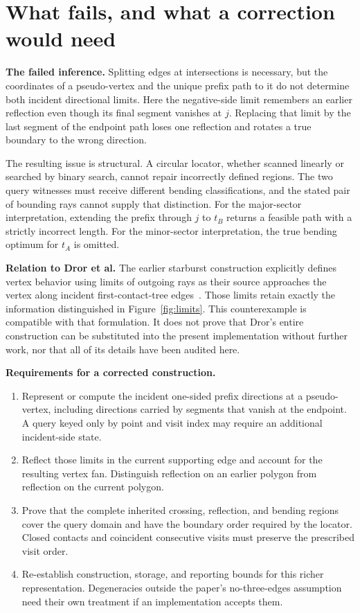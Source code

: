 \documentclass[11pt,a4paper]{article}
\newcommand{\sect}[2]{\section{#1}\label{#2}}
\begin{document}
\clearpage
\sect{What fails, and what a correction would need}{sec:scope}

\textbf{The failed inference.} Splitting edges at intersections is necessary,
but the coordinates of a pseudo-vertex and the unique prefix path to it do not
determine both incident directional limits. Here the negative-side limit
remembers an earlier reflection even though its final segment vanishes at $j$.
Replacing that limit by the last segment of the endpoint path loses one
reflection and rotates a true boundary to the wrong direction.

The resulting issue is structural. A circular locator, whether scanned
linearly or searched by binary search, cannot repair incorrectly defined
regions. The two query witnesses must receive different bending classifications,
and the stated pair of bounding rays cannot supply that distinction. For the
major-sector interpretation, extending the prefix through $j$ to $t_B$ returns
a feasible path with a strictly incorrect length. For the minor-sector
interpretation, the true bending optimum for $t_A$ is omitted.

\textbf{Relation to Dror et al.} The earlier starburst construction explicitly
defines vertex behavior using limits of outgoing rays as their source
approaches the vertex along incident first-contact-tree edges~\cite[Section
4.1, Claim 1 immediately before Lemma 7, p.~477]{dror}. Those limits retain
exactly the information distinguished in Figure~\ref{fig:limits}. This
counterexample is compatible with that formulation. It does not prove that
Dror's entire construction can be substituted into the present implementation
without further work, nor that all of its details have been audited here.

\textbf{Requirements for a corrected construction.}
\begin{enumerate}
 \item Represent or compute the incident one-sided prefix directions at a
 pseudo-vertex, including directions carried by segments that vanish at the
 endpoint. A query keyed only by point and visit index may require an
 additional incident-side state.
 \item Reflect those limits in the current supporting edge and account for
 the resulting vertex fan. Distinguish reflection on an earlier polygon from
 reflection on the current polygon.
 \item Prove that the complete inherited crossing, reflection, and bending
 regions cover the query domain and have the boundary order required by the
 locator. Closed contacts and coincident consecutive visits must preserve the
 prescribed visit order.
 \item Re-establish construction, storage, and reporting bounds for this
 richer representation. Degeneracies outside the paper's no-three-edges
 assumption need their own treatment if an implementation accepts them.
\end{enumerate}
\end{document}
